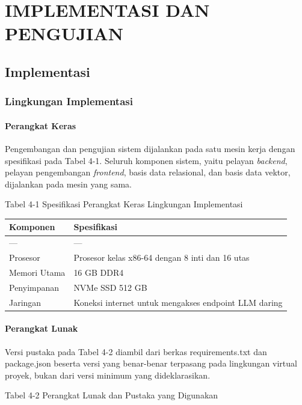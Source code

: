 \documentclass[12pt,a4paper]{article}
\begin{document}
\section*{IMPLEMENTASI DAN PENGUJIAN}
\subsection*{Implementasi}
\subsubsection*{Lingkungan Implementasi}
\paragraph*{Perangkat Keras}
Pengembangan dan pengujian sistem dijalankan pada satu mesin kerja dengan spesifikasi pada Tabel 4-1. Seluruh komponen sistem, yaitu pelayan \textit{backend}, pelayan pengembangan \textit{frontend}, basis data relasional, dan basis data vektor, dijalankan pada mesin yang sama.

Tabel 4-1	Spesifikasi Perangkat Keras Lingkungan Implementasi

\begin{table}[h]
\centering
\begin{tabular}{ll}
\toprule
Komponen & Spesifikasi \\
\midrule
--- & --- \\
Prosesor & Prosesor kelas x86-64 dengan 8 inti dan 16 utas \\
Memori Utama & 16 GB DDR4 \\
Penyimpanan & NVMe SSD 512 GB \\
Jaringan & Koneksi internet untuk mengakses endpoint LLM daring \\
\bottomrule
\end{tabular}
\end{table}
\paragraph*{Perangkat Lunak}
Versi pustaka pada Tabel 4-2 diambil dari berkas requirements.txt dan package.json beserta versi yang benar-benar terpasang pada lingkungan virtual proyek, bukan dari versi minimum yang dideklarasikan.

Tabel 4-2	Perangkat Lunak dan Pustaka yang Digunakan
\end{document}
